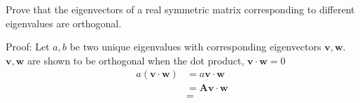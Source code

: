 Prove that the eigenvectors of a real symmetric matrix corresponding to different eigenvalues are orthogonal.

Proof: Let $a,b$ be two unique eigenvalues with corresponding eigenvectors $\boldsymbol{v},\boldsymbol{w}$. $\boldsymbol{v}, \boldsymbol{w}$ are shown to be orthogonal when the dot product, $\boldsymbol{v}\cdot \boldsymbol{w}=0$
\begin{equation*}
	\begin{split}
		a\left(\boldsymbol{v}\cdot \boldsymbol{w}\right)&=a\boldsymbol{v}\cdot \boldsymbol{w} \\
		&=\boldsymbol{A}\boldsymbol{v} \cdot \boldsymbol{w}\\
		&=
	\end{split}
\end{equation*}